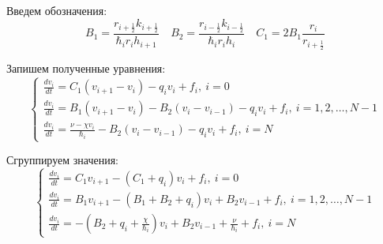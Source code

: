 Введем обозначения:
\[
  B_1 =\frac{r_{i + \frac{1}{2}} k_{i + \frac{1}{2}}}{\hbar_i r_i h_{i + 1}} 
  \quad B_2 = \frac{r_{i - \frac{1}{2}} k_{i - \frac{1}{2}}}{\hbar_i r_i h_{i}} \quad C_1 = 2 B_1 \frac{r_i}{r_{i+\frac{1}{2}}}
\]

Запишем полученные уравнения:
\[
  \begin{cases}
    \frac{d v_i}{dt} = C_1 (v_{i+1}-v_i) - q_i v_i + f_i,\ i = 0 \\

    \frac{d v_i}{dt} = B_1 (v_{i+1}-v_i) - B_2 (v_{i}-v_{i-1}) - q_i v_i + f_i,\ i = 1, 2, \dots, N-1 \\

    \frac{d v_i}{dt} = \frac{\nu - \chi v_i}{\hbar_i} - B_2 (v_{i}-v_{i-1}) - q_i v_i + f_i,\ i = N
  \end{cases}
\]

Сгруппируем значения:
\[
  \begin{cases}
    \frac{d v_i}{dt} = C_1 v_{i+1} - (C_1 + q_i) v_i + f_i,\ i=0 \\
    \frac{d v_i}{dt} = B_1 v_{i+1} - (B_1 + B_2 + q_i) v_i + B_2 v_{i - 1} + f_i,\ i = 1, 2,\dots, N-1\\
    \frac{d v_i}{dt} = -(B_2 + q_i + \frac{\chi}{\hbar_i})v_i + B_2 v_{i - 1} + \frac{\nu}{\hbar_i} + f_i,\ i = N
  \end{cases}
\]

